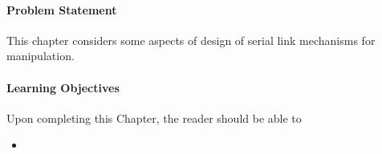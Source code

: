 
\paragraph{Problem Statement}
 This chapter considers some aspects of design of serial link mechanisms for manipulation.

\paragraph{Learning Objectives}
Upon completing this Chapter, the reader should be able to
\begin{itemize}
  \item 
\end{itemize}